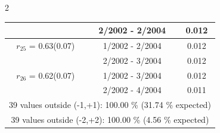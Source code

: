 \begin{multicols}{2}
{\begin{tabular}{ccc}
&        2/2002 -  2/2004 &        0.012  \vspace{-.02in} \\ \hline 
  $r_{25}$ = 0.63(0.07) &       1/2002 -  2/2004 &        0.012   \vspace{-.10in} \\  
&        2/2002 -  3/2004 &        0.012  \vspace{-.02in} \\ \hline 
  $r_{26}$ = 0.62(0.07) &       1/2002 -  3/2004 &        0.012   \vspace{-.10in} \\  
&        2/2002 -  4/2004 &        0.011  \vspace{-.02in} \\ \hline 
\multicolumn{3}{c}{              39 values outside (-1,+1): 100.00  \% (31.74  \% expected)}\vspace{-.10in} \\ 
\multicolumn{3}{c}{              39 values outside (-2,+2): 100.00 \%  (4.56 \% expected) } \\
 \end{tabular} \\ 
 } 
\end{multicols} 
